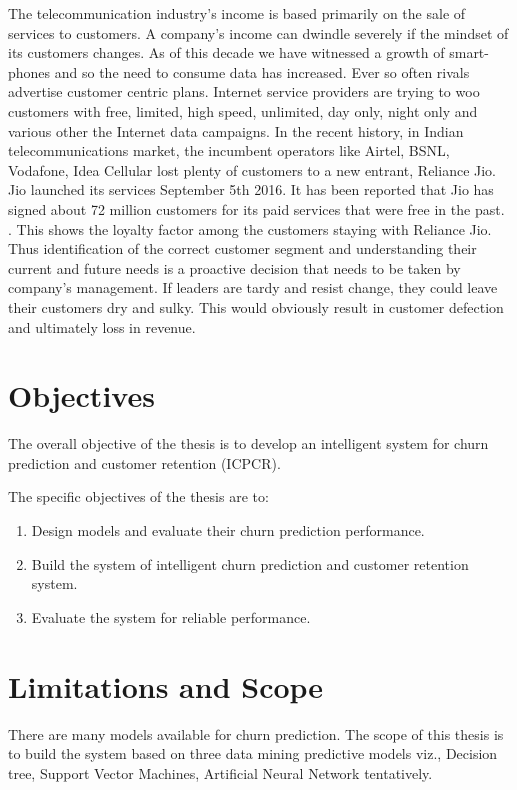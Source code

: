 The telecommunication industry’s income is based primarily on the sale of services to customers. A company’s income can dwindle severely if the mindset of its customers changes. As of this decade we have witnessed a growth of smart-phones and so the need to consume data has increased. Ever so often rivals advertise customer centric plans. Internet service providers are trying to woo customers with free, limited, high speed, unlimited, day only, night only and various other the Internet data campaigns. 
In the recent history, in Indian telecommunications market, the incumbent operators like Airtel, BSNL, Vodafone, Idea Cellular lost plenty of customers to a new entrant, Reliance Jio. Jio launched its services September 5th 2016. It has been reported that Jio has signed about 72 million customers for its paid services that were free in the past. . This shows the loyalty factor among the customers staying with Reliance Jio.
Thus identification of the correct customer segment and understanding their current and future needs is a proactive decision that needs to be taken by company’s management. If leaders are tardy and resist change, they could leave their customers dry and sulky. This would obviously result in customer defection and ultimately loss in revenue.

\section{Objectives}

The overall objective of the thesis is to develop an intelligent system for churn prediction and customer retention (ICPCR). 

The specific objectives of the thesis are to:
\begin{enumerate}
	\item Design models and evaluate their churn prediction performance.
	\item Build the system of intelligent churn prediction and customer retention system.
	\item Evaluate the system for reliable performance.
\end{enumerate}


\section{Limitations and Scope}
There are many models available for churn prediction. The scope of this thesis is to build the system  based on three data mining predictive models viz., Decision tree, Support Vector Machines, Artificial Neural Network tentatively.

